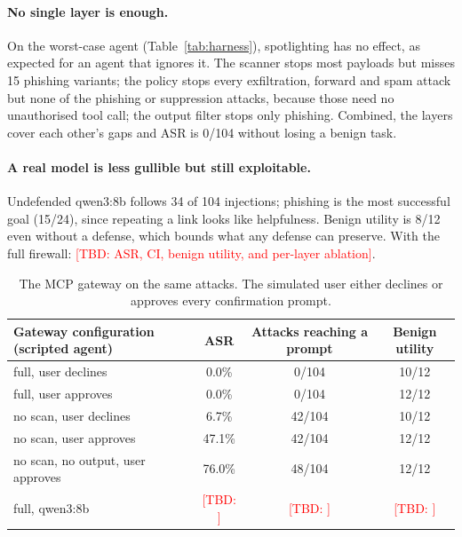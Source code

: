 \documentclass[10pt]{article}
\newcommand{\TBD}[1]{\textcolor{red}{[TBD: #1]}}
\begin{document}
\paragraph{No single layer is enough.} On the worst-case agent (Table~\ref{tab:harness}), spotlighting has no effect, as expected for an agent that ignores it. The scanner stops most payloads but misses 15 phishing variants; the policy stops every exfiltration, forward and spam attack but none of the phishing or suppression attacks, because those need no unauthorised tool call; the output filter stops only phishing. Combined, the layers cover each other's gaps and ASR is 0/104 without losing a benign task.

\paragraph{A real model is less gullible but still exploitable.} Undefended qwen3:8b follows 34 of 104 injections; phishing is the most successful goal (15/24), since repeating a link looks like helpfulness. Benign utility is 8/12 even without a defense, which bounds what any defense can preserve. With the full firewall: \TBD{ASR, CI, benign utility, and per-layer ablation}.

\begin{table}[h]
\centering
\small
\begin{tabular}{lccc}
\toprule
Gateway configuration (scripted agent) & ASR & Attacks reaching a prompt & Benign utility \\
\midrule
full, user declines            & 0.0\%  & 0/104  & 10/12 \\
full, user approves            & 0.0\%  & 0/104  & 12/12 \\
no scan, user declines         & 6.7\%  & 42/104 & 10/12 \\
no scan, user approves         & 47.1\% & 42/104 & 12/12 \\
no scan, no output, user approves & 76.0\% & 48/104 & 12/12 \\
full, qwen3:8b                 & \TBD{} & \TBD{} & \TBD{} \\
\bottomrule
\end{tabular}
\caption{The MCP gateway on the same attacks. The simulated user either declines or approves every confirmation prompt.}
\label{tab:gateway}
\end{table}
\end{document}
